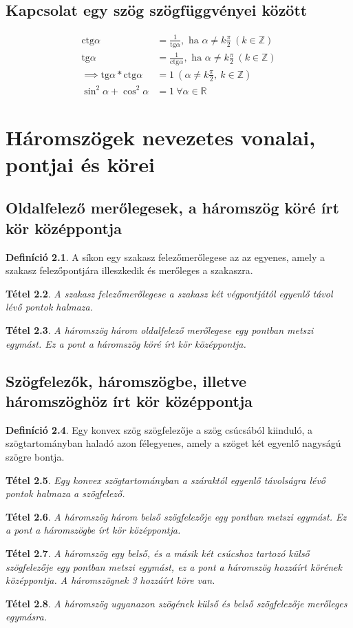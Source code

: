 \documentclass[twoside,12pt]{report}
\newtheorem{theorem}{Tétel}[section]
\theoremstyle{definition}
\newtheorem{definition}[theorem]{Definíció}
\begin{document}
\section{Kapcsolat egy szög szögfüggvényei között}
	\begin{align*}
		\text{ctg}\alpha&=\frac{1}{\text{tg}\alpha}, \text{ ha }\alpha\ne k\frac{\pi}{2}\ (k\in\mathbb{Z})\\
		\text{tg}\alpha&=\frac{1}{\text{ctg}\alpha}, \text{ ha }\alpha\ne k\frac{\pi}{2}\ (k\in\mathbb{Z})\\
		\implies \text{tg}\alpha*\text{ctg}\alpha&=1\ (\alpha\ne k\frac{\pi}{2},\ k\in\mathbb{Z})\\
		\sin^2\alpha+\cos^2\alpha&=1\ \forall\alpha\in\mathbb{R}
	\end{align*}
\chapter{Háromszögek nevezetes vonalai, pontjai és körei}
\section{Oldalfelező merőlegesek, a háromszög köré írt kör középpontja}
	\begin{definition}
		A síkon egy szakasz felezőmerőlegese az az egyenes, amely a szakasz felezőpontjára
		illeszkedik és merőleges a szakaszra.
	\end{definition}
	\begin{theorem}
		A szakasz felezőmerőlegese a szakasz két végpontjától egyenlő távol lévő pontok halmaza.
	\end{theorem}
	\begin{theorem}
		A háromszög három oldalfelező merőlegese egy pontban metszi egymást. Ez a pont a háromszög
		köré írt kör középpontja.
	\end{theorem}
\section{Szögfelezők, háromszögbe, illetve háromszöghöz írt kör középpontja}
	\begin{definition}
		Egy konvex szög szögfelezője a szög csúcsából kiinduló, a szögtartományban haladó
		azon félegyenes, amely a szöget két egyenlő nagyságú szögre bontja.
	\end{definition}
	\begin{theorem}
		Egy konvex szögtartományban a száraktól egyenlő távolságra lévő pontok halmaza a szögfelező.
	\end{theorem}
	\begin{theorem}
		A háromszög három belső szögfelezője egy pontban metszi egymást. Ez a pont a háromszögbe
		írt kör középpontja.
	\end{theorem}
	\begin{theorem}
		A háromszög egy belső, és a másik két csúcshoz tartozó külső szögfelezője egy pontban
		metszi egymást, ez a pont a háromszög hozzáírt körének középpontja. A háromszögnek 3
		hozzáírt köre van.
	\end{theorem}
	\begin{theorem}
		A háromszög ugyanazon szögének külső és belső szögfelezője merőleges egymásra.
	\end{theorem}
\end{document}
